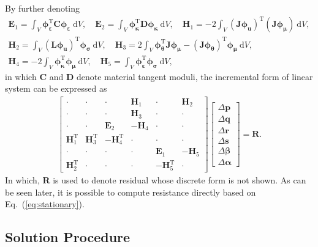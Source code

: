 \documentclass[3p,sort&compress,11pt,fleqn,review]{elsarticle}
\newcommand*{\eqsref}[1]{Eq.~(\ref{#1})}
\newcommand*{\mb}[1]{\boldsymbol{#1}}
\newcommand*{\mT}{\mathrm{T}}
\newcommand*{\md}[1]{\mathrm{d}#1}
\begin{document}
By further denoting
\begin{gather}
\mb{E}_1=\int_V\mb{\phi}_{\mb{\varepsilon}}^\mT\mb{C}\mb{\phi}_{\mb{\varepsilon}}~\md{V},\quad
\mb{E}_2=\int_V\mb{\phi}_{\mb{\kappa}}^\mT\mb{D}\mb{\phi}_{\mb{\kappa}}~\md{V},\quad
\mb{H}_1=-2\int_V\left(\mb{J}\mb{\phi}_{\mb{u}}\right)^\mT\left(\mb{J}\mb{\phi}_{\mb{\mu}}\right)~\md{V},\\
\mb{H}_2=\int_V\left(\mb{L}\mb{\phi}_{\mb{u}}\right)^\mT\mb{\phi}_{\mb{\sigma}}~\md{V},\quad
\mb{H}_3=2\int_V\mb{\phi}_{\mb{\theta}}^\mT\mb{J}\mb{\phi}_{\mb{\mu}}-\left(\mb{J}\mb{\phi}_{\mb{\theta}}\right)^\mT\mb{\phi}_{\mb{\mu}}~\md{V},\\
\mb{H}_4=-2\int_V\mb{\phi}_{\mb{\kappa}}^\mT\mb{\phi}_{\mb{\mu}}~\md{V},\quad
\mb{H}_5=\int_V\mb{\phi}_{\mb{\varepsilon}}^\mT\mb{\phi}_{\mb{\sigma}}~\md{V},\quad
\end{gather}
in which $\mb{C}$ and $\mb{D}$ denote material tangent moduli, the incremental form of linear system can be expressed as
\begin{gather}\label{eq:incremental_form}
\begin{bmatrix}
\cdot&\cdot&\cdot&\mb{H}_1&\cdot&\mb{H}_2\\
\cdot&\cdot&\cdot&\mb{H}_3&\cdot&\cdot\\
\cdot&\cdot&\mb{E}_2&-\mb{H}_4&\cdot&\cdot\\
\mb{H}_1^\mT&\mb{H}_3^\mT&-\mb{H}_4^\mT&\cdot&\cdot&\cdot\\
\cdot&\cdot&\cdot&\cdot&\mb{E}_1&-\mb{H}_5\\
\mb{H}_2^\mT&\cdot&\cdot&\cdot&-\mb{H}_5^\mT&\cdot
\end{bmatrix}
\begin{bmatrix}
\Delta\mb{p}\\\Delta\mb{q}\\\Delta\mb{r}\\\Delta\mb{s}\\\Delta\mb{\beta}\\\Delta\mb{\alpha}
\end{bmatrix}=\mb{R}.
\end{gather}
In which, $\mb{R}$ is used to denote residual whose discrete form is not shown. As can be seen later, it is possible to compute resistance directly based on \eqsref{eq:stationary}.
\subsection{Solution Procedure}
\end{document}
